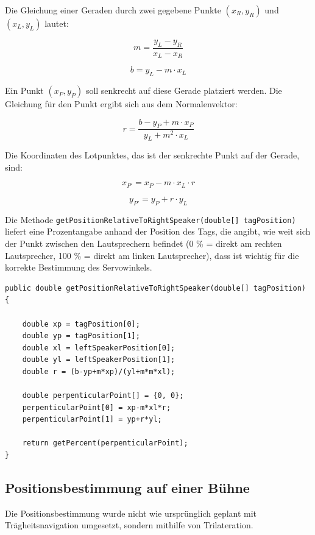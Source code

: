 Die Gleichung einer Geraden durch zwei gegebene Punkte \( (x_R, y_R) \) und \( (x_L, y_L) \) lautet:

\begin{equation*}
	m = \frac{y_L - y_R}{x_L - x_R}
\end{equation*}

\begin{equation*}
	b = y_L - m \cdot x_L
\end{equation*}

Ein Punkt \( (x_P, y_P) \) soll senkrecht auf diese Gerade platziert werden. Die Gleichung für den Punkt ergibt sich aus dem Normalenvektor:

\begin{equation*}
	r = \frac{b - y_P + m \cdot x_P}{y_L + m^2 \cdot x_L}
\end{equation*}

Die Koordinaten des Lotpunktes, das ist der senkrechte Punkt auf der Gerade, sind:

\begin{equation*}
	x_{P'} = x_P - m \cdot x_L \cdot r
\end{equation*}

\begin{equation*}
	y_{P'} = y_P + r \cdot y_L
\end{equation*}

 
Die Methode \texttt{getPositionRelativeToRightSpeaker(double[] tagPosition)} liefert eine Prozentangabe anhand der Position des Tags, die angibt, wie weit sich der Punkt zwischen den Lautsprechern befindet (0 \% = direkt am rechten Lautsprecher, 100 \% = direkt am linken Lautsprecher), dass ist wichtig für die korrekte Bestimmung des Servowinkels.

\begin{lstlisting}[style=Java, caption=Auszug aus EqualizerSettingCalculator.java, captionpos=b]
public double getPositionRelativeToRightSpeaker(double[] tagPosition) {
	
	double xp = tagPosition[0];
	double yp = tagPosition[1];
	double xl = leftSpeakerPosition[0];
	double yl = leftSpeakerPosition[1];
	double r = (b-yp+m*xp)/(yl+m*m*xl);
	
	double perpenticularPoint[] = {0, 0};
	perpenticularPoint[0] = xp-m*xl*r;
	perpenticularPoint[1] = yp+r*yl;
	
	return getPercent(perpenticularPoint);
}
\end{lstlisting}



\newpage
\subsection{Positionsbestimmung auf einer Bühne}
Die Positionsbestimmung wurde nicht wie ursprünglich geplant mit Trägheitsnavigation umgesetzt, sondern mithilfe von Trilateration. 

